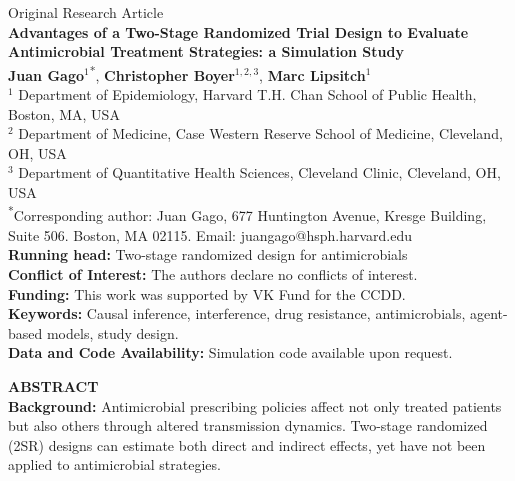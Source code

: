 \documentclass[12pt]{article}
\begin{document}
\begin{titlepage}
\centering
{\Large Original Research Article}\\[2em]
{\LARGE\bfseries Advantages of a Two-Stage Randomized Trial Design to Evaluate Antimicrobial Treatment Strategies: a Simulation Study}\\[2em]

\textbf{Juan Gago}$^{1}$\textsuperscript{*}, \textbf{Christopher Boyer}$^{1,2,3}$, \textbf{Marc Lipsitch}$^{1}$\\[1em]

{\small
$^1$ Department of Epidemiology, Harvard T.H. Chan School of Public Health, Boston, MA, USA\\
$^2$ Department of Medicine, Case Western Reserve School of Medicine, Cleveland, OH, USA\\
$^3$ Department of Quantitative Health Sciences, Cleveland Clinic, Cleveland, OH, USA\\[1em]
\textsuperscript{*}Corresponding author: Juan Gago, 677 Huntington Avenue, Kresge Building, Suite 506. Boston, MA 02115. Email: juangago@hsph.harvard.edu
}\\[2em]

\textbf{Running head:} Two-stage randomized design for antimicrobials\\[1em]
\textbf{Conflict of Interest:} The authors declare no conflicts of interest.\\[0.5em]
\textbf{Funding:} This work was supported by VK Fund for the CCDD.\\[0.5em]
\textbf{Keywords:} Causal inference, interference, drug resistance, antimicrobials, agent-based models, study design.\\[0.5em]
\textbf{Data and Code Availability:} Simulation code available upon request.\\[0.5em]

\end{titlepage}

\newpage

\noindent\textbf{ABSTRACT}\\[0.5em]

\noindent\textbf{Background:} Antimicrobial prescribing policies affect not only treated patients but also others through altered transmission dynamics. Two-stage randomized (2SR) designs can estimate both direct and indirect effects, yet have not been applied to antimicrobial strategies.\\[0.3em]
\end{document}
